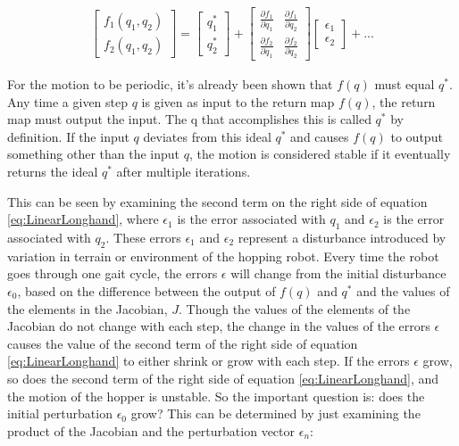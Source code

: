 \begin{align}
\begin{bmatrix}
f_{1} (q_{1},q_{2}) \\
f_{2} (q_{1},q_{2}) 
\end{bmatrix}
=
\begin{bmatrix}
q_{1}^{*} \\
q_{2}^{*}
\end{bmatrix}
+
\begin{bmatrix}
\frac{\partial f_{1}}{\partial q_{1}} &  \frac{\partial f_{1}}{\partial q_{2}} \\
\frac{\partial f_{2}}{\partial q_{1}} & \frac{\partial f_{2}}{\partial q_{2}}
\end{bmatrix}
\begin{bmatrix}
\epsilon_{1} \\
\epsilon_{2}
\end{bmatrix}
+
...
\label{eq:LinearLonghand}
\end{align}

For the motion to be periodic, it's already been shown that $f(q)$ must equal $q^{*}$. Any time a given step $q$ is given as input to the return map $f(q)$, the return map must output the input. The q that accomplishes this is called $q^{*}$ by definition. If the input $q$ deviates from this ideal $q^{*}$ and causes $f(q)$ to output something other than the input $q$, the motion is considered stable if it eventually returns the ideal $q^{*}$ after multiple iterations. 

This can be seen by examining the second term on the right side of equation \ref{eq:LinearLonghand}, where $\epsilon_{1}$ is the error associated with $q_{1}$ and $\epsilon_{2}$ is the error associated with $q_{2}$. These errors $\epsilon_{1}$ and $\epsilon_{2}$ represent a disturbance introduced by variation in terrain or environment of the hopping robot. Every time the robot goes through one gait cycle, the errors $\epsilon$ will change from the initial disturbance $\epsilon_{0}$, based on the difference between the output of $f(q)$ and $q^{*}$ and the values of the elements in the Jacobian, $J$. Though the values of the elements of the Jacobian do not change with each step, the change in the values of the errors $\epsilon$ causes the value of the second term of the right side of equation \ref{eq:LinearLonghand} to either shrink or grow with each step. If the errors $\epsilon$ grow, so does the second term of the right side of equation \ref{eq:LinearLonghand}, and the motion of the hopper is unstable. So the important question is: does the initial perturbation $\epsilon_{0}$ grow? This can be determined by just examining the product of the Jacobian and the perturbation vector $\epsilon_{n}$:

